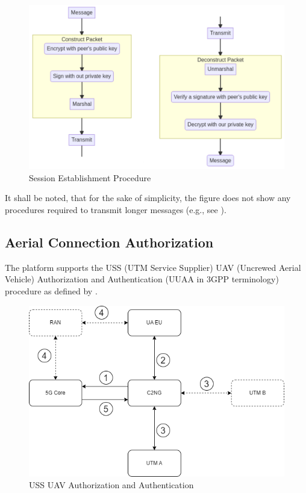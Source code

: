 \documentclass[a4paper,conference]{IEEEtran}
\begin{document}
\begin{figure}[!ht]
\centering
\includegraphics[width=0.9\linewidth]{images/exchange.png}
\caption{Session Establishment Procedure}\label{fig:exchange}
\end{figure}

It shall be noted, that for the sake of simplicity, the figure does not show any procedures required to transmit longer messages (e.g., see \cite{cryptoeprint:2000/065}). 

\subsection{Aerial Connection Authorization}
\label{uuaa}

The platform supports the USS (UTM Service Supplier) UAV (Uncrewed Aerial Vehicle) Authorization and Authentication (UUAA in 3GPP terminology) procedure as defined by \cite{3gpp:uuaa}. 

\begin{figure}[!ht]
\centering
\includegraphics[width=0.9\linewidth]{images/uuaa.png}
\caption{USS UAV Authorization and Authentication}\label{fig:uuaa}
\end{figure}
\end{document}
